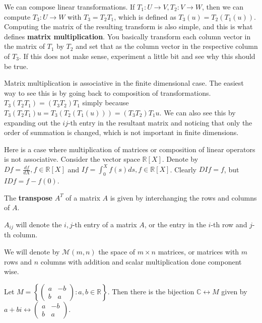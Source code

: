 \begin{rem}
We can compose linear transformations. If $T_1 : U \rightarrow V, T_2 :
V \rightarrow W$, then we can compute $T_3 : U \rightarrow W$ with $T_3
= T_2 T_1$, which is defined as $T_3(u) = T_2(T_1(u))$. Computing the
matrix of the resulting transform is also simple, and this is what
defines \textbf{matrix multiplication}. You basically transform each
column vector in the matrix of $T_1$ by $T_2$ and set that as the column
vector in the respective column of $T_3$. If this does not make sense,
experiment a little bit and see why this should be true.
\end{rem}

\begin{rem}
Matrix multiplication is associative in the finite dimensional case. The
easiest way to see this is by going back to composition of
transformations. $T_3 (T_2 T_1) = (T_3 T_2) T_1$ simply because $T_3
(T_2 T_1) u = T_3(T_2(T_1(u))) = (T_3 T_2) T_1 u$. We can also see this
by expanding out the $ij$-th entry in the resultant matrix and noticing
that only the order of summation is changed, which is not important in
finite dimensions.
\end{rem}

\begin{ex}
Here is a case where multiplication of matrices or composition of linear
operators is not associative. Consider the vector space $\mathbb{R}[X]$.
Denote by $Df = \frac{df}{dX}, f \in \mathbb{R}[X]$ and $If = \int_0^X
f(s) ds, f \in \mathbb{R}[X]$. Clearly $DIf = f$, but $IDf = f - f(0)$.
\end{ex}

\begin{df}
The \textbf{transpose} $A^T$ of a matrix $A$ is given by interchanging
the rows and columns of $A$.
\end{df}

\begin{rem}
$A_{ij}$ will denote the $i,j$-th entry of a matrix $A$, or the entry in
the $i$-th row and $j$-th column.
\end{rem}

\begin{df}
We will denote by $\mathcal{M}(m, n)$ the space of $m \times n$
matrices, or matrices with $m$ rows and $n$ columns with addition and
scalar multiplication done component wise.
\end{df}

\begin{rem}
Let $M = \left\lbrace \begin{pmatrix} a & -b \\ b & a \end{pmatrix} : a, b
\in \mathbb{R}\right\rbrace$. Then there is the bijection $\mathbb{C}
\leftrightarrow M$ given by $a + bi \leftrightarrow \begin{pmatrix} a &
-b \\ b & a \end{pmatrix}$.
\end{rem}
